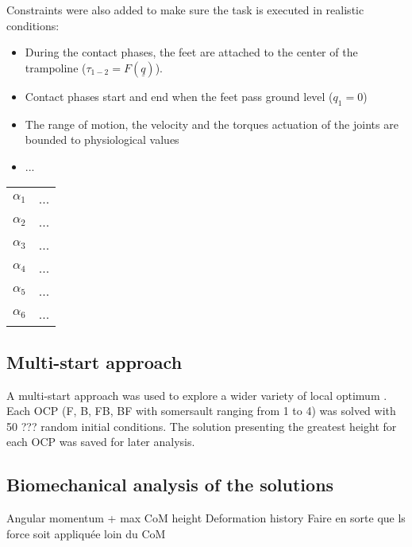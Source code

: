 Constraints were also added to make sure the task is executed in realistic conditions: 
\begin{itemize}
\item During the contact phases, the feet are attached to the center of the trampoline ($\tau_{1-2} = F(\underline{q})$).
\item Contact phases start and end when the feet pass ground level ($q_1 = 0$)
\item The range of motion, the velocity and the torques actuation of the joints are bounded to physiological values
\item ...
\end{itemize}


\begin{center}
\begin{tabular}{ c c }
 $\alpha_1$ & ... \\ 
 $\alpha_2$ & ... \\ 
 $\alpha_3$ & ... \\ 
 $\alpha_4$ & ... \\ 
 $\alpha_5$ & ... \\ 
 $\alpha_6$ & ...
\end{tabular}
\label{Tab:weighting}
\end{center}



\subsection{Multi-start approach}\label{subsec:2f}
A multi-start approach was used to explore a wider variety of local optimum \cite{huchez2015local}.
Each OCP (F, B, FB, BF with somersault ranging from 1 to 4) was solved with 50 ??? random initial conditions.
The solution presenting the greatest height for each OCP was saved for later analysis.


\subsection{Biomechanical analysis of the solutions}\label{subsec:2g}
Angular momentum + max CoM height
Deformation history
Faire en sorte que ls force soit appliquée loin du CoM





